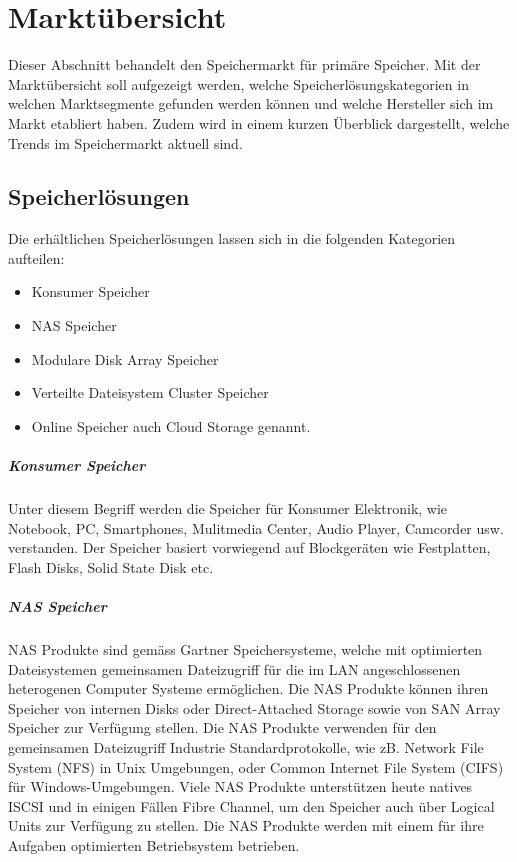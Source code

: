 \cleardoublepage
\chapter{Marktübersicht}

Dieser Abschnitt behandelt den Speichermarkt für primäre Speicher. Mit der Marktübersicht soll aufgezeigt werden, welche Speicherlösungskategorien in welchen Marktsegmente gefunden werden können und welche Hersteller sich im Markt etabliert haben. Zudem wird in einem kurzen Überblick dargestellt, welche Trends im Speichermarkt aktuell sind.

\section{Speicherlösungen}
Die erhältlichen Speicherlösungen lassen sich in die folgenden Kategorien aufteilen: 
\begin{itemize}
\item Konsumer Speicher
\item NAS Speicher
\item Modulare Disk Array Speicher
\item Verteilte Dateisystem Cluster Speicher 
\item Online Speicher auch Cloud Storage genannt.
\end{itemize}

\paragraph*{Konsumer Speicher}
Unter diesem Begriff werden die Speicher für Konsumer Elektronik, wie Notebook, PC, Smartphones, Mulitmedia Center, Audio Player, Camcorder usw. verstanden. Der Speicher basiert vorwiegend auf Blockgeräten wie Festplatten, Flash Disks, Solid State Disk etc.

\paragraph*{NAS Speicher}
NAS Produkte sind gemäss Gartner Speichersysteme, welche mit optimierten Dateisystemen gemeinsamen Dateizugriff für die im LAN angeschlossenen heterogenen Computer Systeme ermöglichen. Die NAS Produkte können ihren Speicher von internen Disks oder Direct-Attached Storage sowie von SAN Array Speicher zur Verfügung stellen. Die NAS Produkte verwenden für den gemeinsamen Dateizugriff Industrie Standardprotokolle, wie zB. Network File System (NFS) in Unix Umgebungen, oder Common Internet File System (CIFS) für Windows-Umgebungen. 
Viele NAS Produkte unterstützen heute natives ISCSI und in einigen Fällen Fibre Channel, um den Speicher auch über Logical Units zur Verfügung zu stellen. Die NAS Produkte werden mit einem für ihre Aufgaben optimierten Betriebsystem betrieben. \cite{RogerW.CoxPushanRinnenStanleyZaffos2011}

